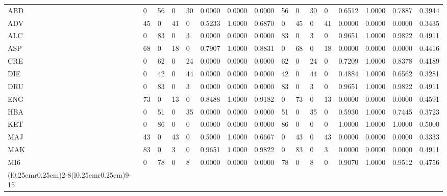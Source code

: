 \begin{table}[!tb]
\begin{tabular}{E{6.8mm}T{5mm}T{5mm}T{5mm}T{5mm}T{8mm}T{8mm}T{8mm}T{5mm}T{5mm}T{5mm}T{5mm}T{8mm}T{8mm}T{8mm}T{9mm}}
\textsf{ABD} &  0 & 56 &  0 & 30 & 0.0000 & 0.0000 & 0.0000 & 56 &  0 & 30 &  0 & 0.6512 & 1.0000 & 0.7887 & 0.3944\\
\textsf{ADV} & 45 &  0 & 41 &  0 & 0.5233 & 1.0000 & 0.6870 &  0 & 45 &  0 & 41 & 0.0000 & 0.0000 & 0.0000 & 0.3435\\
\textsf{ALC} &  0 & 83 &  0 &  3 & 0.0000 & 0.0000 & 0.0000 & 83 &  0 &  3 &  0 & 0.9651 & 1.0000 & 0.9822 & 0.4911\\
\textsf{ASP} & 68 &  0 & 18 &  0 & 0.7907 & 1.0000 & 0.8831 &  0 & 68 &  0 & 18 & 0.0000 & 0.0000 & 0.0000 & 0.4416\\
\textsf{CRE} &  0 & 62 &  0 & 24 & 0.0000 & 0.0000 & 0.0000 & 62 &  0 & 24 &  0 & 0.7209 & 1.0000 & 0.8378 & 0.4189\\
\textsf{DIE} &  0 & 42 &  0 & 44 & 0.0000 & 0.0000 & 0.0000 & 42 &  0 & 44 &  0 & 0.4884 & 1.0000 & 0.6562 & 0.3281\\
\textsf{DRU} &  0 & 83 &  0 &  3 & 0.0000 & 0.0000 & 0.0000 & 83 &  0 &  3 &  0 & 0.9651 & 1.0000 & 0.9822 & 0.4911\\
\textsf{ENG} & 73 &  0 & 13 &  0 & 0.8488 & 1.0000 & 0.9182 &  0 & 73 &  0 & 13 & 0.0000 & 0.0000 & 0.0000 & 0.4591\\
\textsf{HBA} &  0 & 51 &  0 & 35 & 0.0000 & 0.0000 & 0.0000 & 51 &  0 & 35 &  0 & 0.5930 & 1.0000 & 0.7445 & 0.3723\\
\textsf{KET} &  0 & 86 &  0 &  0 & 0.0000 & 0.0000 & 0.0000 & 86 &  0 &  0 &  0 & 1.0000 & 1.0000 & 1.0000 & 0.5000\\
\textsf{MAJ} & 43 &  0 & 43 &  0 & 0.5000 & 1.0000 & 0.6667 &  0 & 43 &  0 & 43 & 0.0000 & 0.0000 & 0.0000 & 0.3333\\
\textsf{MAK} & 83 &  0 &  3 &  0 & 0.9651 & 1.0000 & 0.9822 &  0 & 83 &  0 &  3 & 0.0000 & 0.0000 & 0.0000 & 0.4911\\
\textsf{MI6} &  0 & 78 &  0 &  8 & 0.0000 & 0.0000 & 0.0000 & 78 &  0 &  8 &  0 & 0.9070 & 1.0000 & 0.9512 & 0.4756\\


\cmidrule(r{0.25em}){1-1}\cmidrule(l{0.25em}r{0.25em}){2-8}\cmidrule(l{0.25em}r{0.25em}){9-15}\cmidrule(l{0.25em}){16-16}



\end{tabular}
\end{table}
